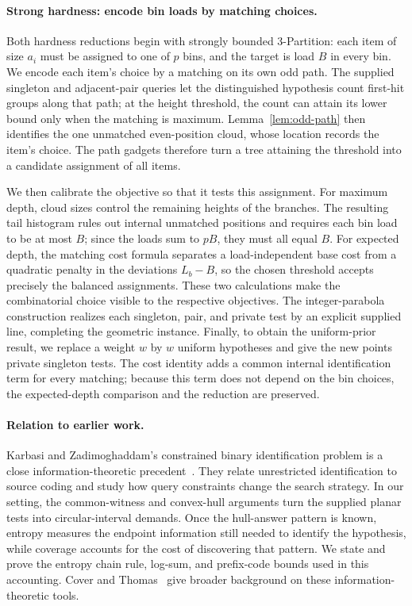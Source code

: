 \paragraph{Strong hardness: encode bin loads by matching choices.}
Both hardness reductions begin with strongly bounded 3-Partition: each
item of size $a_i$ must be assigned to one of $p$ bins, and the target
is load $B$ in every bin. We encode each item's choice by a matching on
its own odd path. The supplied singleton and adjacent-pair queries let
the distinguished hypothesis count first-hit groups along that path;
at the height threshold, the count can attain its lower bound only
when the matching is maximum. Lemma~\ref{lem:odd-path} then identifies
the one unmatched even-position cloud, whose location records the
item's choice. The path gadgets therefore turn a tree attaining the
threshold into a candidate assignment of all items.

We then calibrate the objective so that it tests this assignment.
For maximum depth, cloud sizes control the remaining heights of the
branches. The resulting tail histogram rules out internal unmatched
positions and requires each bin load to be at most $B$; since the loads
sum to $pB$, they must all equal $B$. For expected depth, the matching
cost formula separates a load-independent base cost from a quadratic
penalty in the deviations $L_b-B$, so the chosen threshold accepts
precisely the balanced assignments. These two calculations make the
combinatorial choice visible to the respective objectives. The
integer-parabola construction realizes each singleton, pair, and
private test by an explicit supplied line, completing the geometric
instance. Finally, to obtain the uniform-prior result, we replace a
weight $w$ by $w$ uniform hypotheses and give the new points private
singleton tests. The cost identity adds a common internal
identification term for every matching; because this term does not
depend on the bin choices, the expected-depth comparison and the
reduction are preserved.

\paragraph{Relation to earlier work.}
Karbasi and Zadimoghaddam's constrained binary identification problem
is a close information-theoretic precedent~\cite{karbasi2013}. They
relate unrestricted identification to source coding and study how
query constraints change the search strategy. In our setting, the
common-witness and convex-hull arguments turn the supplied planar
tests into circular-interval demands. Once the hull-answer pattern is
known, entropy measures the
endpoint information still needed to identify the hypothesis, while
coverage accounts for the cost of discovering that pattern. We state
and prove the entropy chain rule, log-sum, and prefix-code bounds used
in this accounting. Cover and Thomas~\cite{ct2006} give broader
background on these information-theoretic tools.

